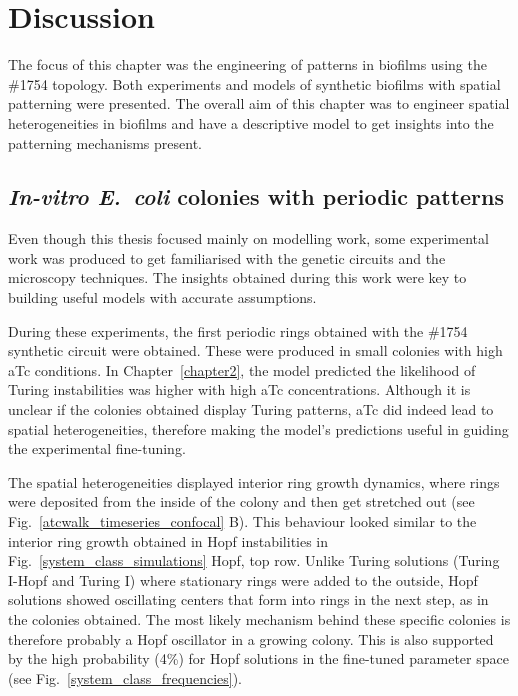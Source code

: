 \section{Discussion}

The focus of this chapter was the engineering of patterns in biofilms using the \#1754 topology.
Both experiments and models of synthetic biofilms with spatial patterning were presented.
The overall aim of this chapter was to engineer spatial heterogeneities in biofilms and have a descriptive model to get insights into the patterning mechanisms present.

\subsection{\textit{In-vitro E.~coli} colonies with periodic patterns}
Even though this thesis focused mainly on modelling work, some experimental work was produced to get familiarised with the genetic circuits and the microscopy techniques.
The insights obtained during this work were key to building useful models with accurate assumptions.

During these experiments, the first periodic rings obtained with the \#1754 synthetic circuit were obtained.
These were produced in small colonies with high aTc conditions.
In Chapter~\ref{chapter2}, the model predicted the likelihood of Turing instabilities was higher with high aTc concentrations.
Although it is unclear if the colonies obtained display Turing patterns, aTc did indeed lead to spatial heterogeneities, therefore making the model's predictions useful in guiding the experimental fine-tuning.

The spatial heterogeneities displayed interior ring growth dynamics, where rings were deposited from the inside of the colony and then get stretched out (see Fig.~\ref{atcwalk_timeseries_confocal} B).
This behaviour looked similar to the interior ring growth obtained in Hopf instabilities in Fig.~\ref{system_class_simulations} Hopf, top row.
Unlike Turing solutions (Turing I-Hopf and Turing I) where stationary rings were added to the outside, Hopf solutions showed oscillating centers that form into rings in the next step, as in the colonies obtained.
The most likely mechanism behind these specific colonies is therefore probably a Hopf oscillator in a growing colony.
This is also supported by the high probability (4\%) for Hopf solutions in the fine-tuned parameter space (see Fig.~\ref{system_class_frequencies}).

